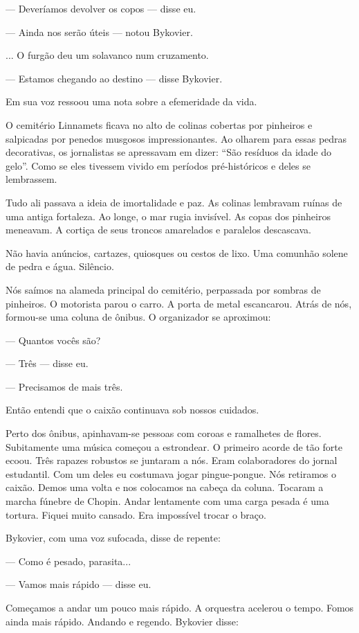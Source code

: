 --- Deveríamos devolver os copos --- disse eu.

--- Ainda nos serão úteis --- notou Bykovier.

... O furgão deu um solavanco num cruzamento.

--- Estamos chegando ao destino --- disse Bykovier.

Em sua voz ressoou uma nota sobre a efemeridade da vida.

O cemitério Linnamets ficava no alto de colinas cobertas por pinheiros e
salpicadas por penedos musgosos impressionantes. Ao olharem para essas
pedras decorativas, os jornalistas se apressavam em dizer: ``São
resíduos da idade do gelo''. Como se eles tivessem vivido em períodos
pré-históricos e deles se lembrassem.

Tudo ali passava a ideia de imortalidade e paz. As colinas lembravam
ruínas de uma antiga fortaleza. Ao longe, o mar rugia invisível. As
copas dos pinheiros meneavam. A cortiça de seus troncos amarelados e
paralelos descascava.

Não havia anúncios, cartazes, quiosques ou cestos de lixo. Uma comunhão
solene de pedra e água. Silêncio.

Nós saímos na alameda principal do cemitério, perpassada por sombras de
pinheiros. O motorista parou o carro. A porta de metal escancarou. Atrás
de nós, formou-se uma coluna de ônibus. O organizador se aproximou:

--- Quantos vocês são?

--- Três --- disse eu.

--- Precisamos de mais três.

Então entendi que o caixão continuava sob nossos cuidados.

Perto dos ônibus, apinhavam-se pessoas com coroas e ramalhetes de
flores. Subitamente uma música começou a estrondear. O primeiro acorde
de tão forte ecoou. Três rapazes robustos se juntaram a nós. Eram
colaboradores do jornal estudantil. Com um deles eu costumava jogar
pingue-pongue. Nós retiramos o caixão. Demos uma volta e nos colocamos
na cabeça da coluna. Tocaram a marcha fúnebre de Chopin. Andar
lentamente com uma carga pesada é uma tortura. Fiquei muito cansado. Era
impossível trocar o braço.

Bykovier, com uma voz sufocada, disse de repente:

--- Como é pesado, parasita...

--- Vamos mais rápido --- disse eu.

Começamos a andar um pouco mais rápido. A orquestra acelerou o tempo.
Fomos ainda mais rápido. Andando e regendo. Bykovier disse:

